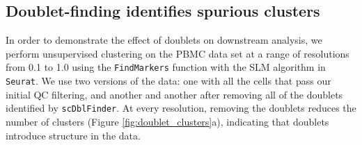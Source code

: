 \documentclass[unnumsec,webpdf,modern,large]{oup-authoring-template}
\begin{document}
	\subsection{Doublet-finding identifies spurious clusters}
	
	In order to demonstrate the effect of doublets on downstream analysis, we perform unsupervised clustering on the PBMC data set at a range of resolutions from 0.1 to 1.0 using the \texttt{FindMarkers} function with the SLM algorithm in \texttt{Seurat}.
	We use two versions of the data: one with all the cells that pass our initial QC filtering, and another  and another after removing all of the doublets identified by  \texttt{scDblFinder}. 
	At every resolution, removing the doublets reduces the number of clusters (Figure \ref{fig:doublet_clusters}a), indicating that doublets introduce structure in the data. 
\end{document}
